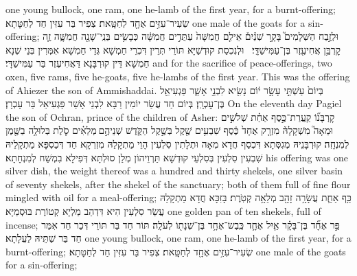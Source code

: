 {one young bullock, one ram, one he-lamb of the first year, for a burnt-offering;}{}
{שְׂעִיר־עִזִּ֥ים אֶחָ֖ד לְחַטָּֽאת׃}
{צְפִיר בַּר עִזִּין חַד לְחַטָּתָא׃}
{one male of the goats for a sin-offering;}{}
{וּלְזֶ֣בַח הַשְּׁלָמִים֮ בָּקָ֣ר שְׁנַ֒יִם֒ אֵילִ֤ם חֲמִשָּׁה֙ עַתֻּדִ֣ים חֲמִשָּׁ֔ה כְּבָשִׂ֥ים בְּנֵֽי־שָׁנָ֖ה חֲמִשָּׁ֑ה זֶ֛ה קׇרְבַּ֥ן אֲחִיעֶ֖זֶר בֶּן־עַמִּישַׁדָּֽי׃ \petucha }
{וּלְנִכְסַת קוּדְשַׁיָּא תּוֹרֵי תְּרֵין דִּכְרֵי חַמְשָׁא גְּדֵי חַמְשָׁא אִמְּרִין בְּנֵי שְׁנָא חַמְשָׁא דֵּין קוּרְבָּנָא דַּאֲחִיעֶזֶר בַּר עַמִּישַׁדָּי׃}
{and for the sacrifice of peace-offerings, two oxen, five rams, five he-goats, five he-lambs of the first year. This was the offering of Ahiezer the son of Ammishaddai.}{}
{בְּיוֹם֙ עַשְׁתֵּ֣י עָשָׂ֣ר י֔וֹם נָשִׂ֖יא לִבְנֵ֣י אָשֵׁ֑ר פַּגְעִיאֵ֖ל בֶּן־עׇכְרָֽן׃}
{בְּיוֹם חַד עֲשַׂר יוֹמִין רַבָּא לִבְנֵי אָשֵׁר פַּגְעִיאֵל בַּר עָכְרָן׃}
{On the eleventh day Pagiel the son of Ochran, prince of the children of Asher:}{}
{קׇרְבָּנ֞וֹ קַֽעֲרַת־כֶּ֣סֶף אַחַ֗ת שְׁלֹשִׁ֣ים וּמֵאָה֮ מִשְׁקָלָהּ֒ מִזְרָ֤ק אֶחָד֙ כֶּ֔סֶף שִׁבְעִ֥ים שֶׁ֖קֶל בְּשֶׁ֣קֶל הַקֹּ֑דֶשׁ שְׁנֵיהֶ֣ם \legarmeh  מְלֵאִ֗ים סֹ֛לֶת בְּלוּלָ֥ה בַשֶּׁ֖מֶן לְמִנְחָֽה׃}
{קוּרְבָּנֵיהּ מְגִסְּתָא דִּכְסַף חֲדָא מְאָה וּתְלָתִין סִלְעִין הָוֵי מַתְקָלַהּ מִזְרְקָא חַד דְּכַסְפָּא מַתְקָלֵיהּ שִׁבְעִין סִלְעִין בְּסִלְעֵי קוּדְשָׁא תַּרְוֵיהוֹן מְלַן סוּלְתָּא דְּפִילָא בִמְשַׁח לְמִנְחָתָא׃}
{his offering was one silver dish, the weight thereof was a hundred and thirty shekels, one silver basin of seventy shekels, after the shekel of the sanctuary; both of them full of fine flour mingled with oil for a meal-offering;}{}
{כַּ֥ף אַחַ֛ת עֲשָׂרָ֥ה זָהָ֖ב מְלֵאָ֥ה קְטֹֽרֶת׃}
{בָּזִכָּא חֲדָא מַתְקָלַהּ עֲשַׂר סִלְעִין הִיא דִּדְהַב מַלְיָא קְטוֹרֶת בּוּסְמַיָּא׃}
{one golden pan of ten shekels, full of incense;}{}
{פַּ֣ר אֶחָ֞ד בֶּן־בָּקָ֗ר אַ֧יִל אֶחָ֛ד כֶּֽבֶשׂ־אֶחָ֥ד בֶּן־שְׁנָת֖וֹ לְעֹלָֽה׃}
{תּוֹר חַד בַּר תּוֹרֵי דְּכַר חַד אִמַּר חַד בַּר שַׁתֵּיהּ לַעֲלָתָא׃}
{one young bullock, one ram, one he-lamb of the first year, for a burnt-offering;}{}
{שְׂעִיר־עִזִּ֥ים אֶחָ֖ד לְחַטָּֽאת׃}
{צְפִיר בַּר עִזִּין חַד לְחַטָּתָא׃}
{one male of the goats for a sin-offering;}{}
